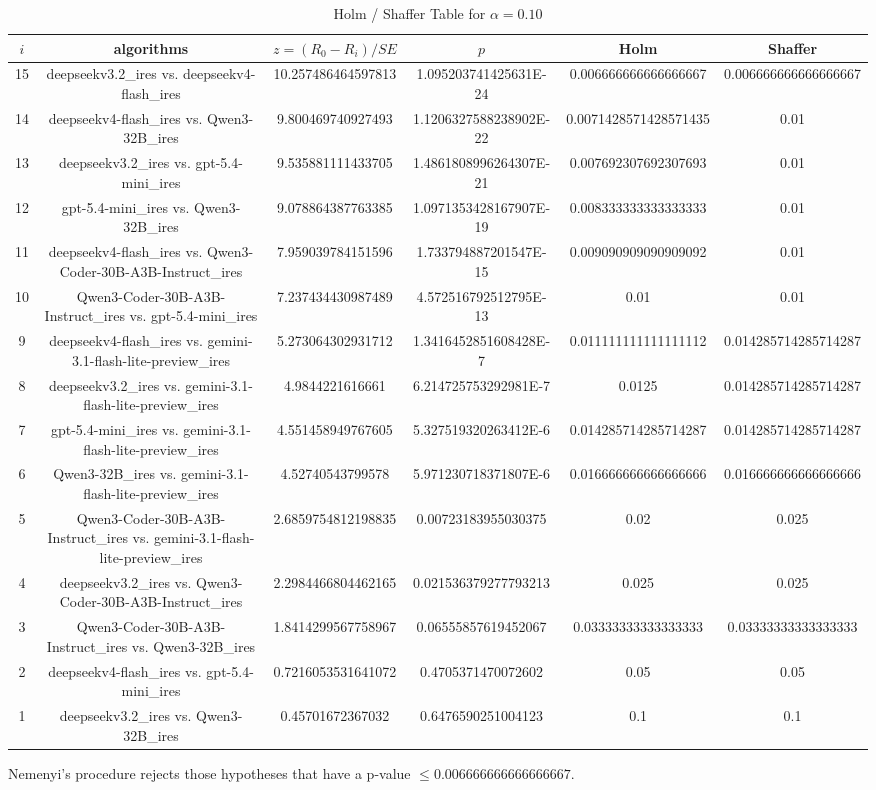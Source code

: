 \documentclass[a4paper,10pt]{article}
\begin{document}
\begin{landscape}
\begin{table}[!htp]
\centering\tiny
\caption{Holm / Shaffer Table for $\alpha=0.10$}
\begin{tabular}{cccccc}
$i$&algorithms&$z=(R_0 - R_i)/SE$&$p$&Holm&Shaffer\\
\hline
15&deepseekv3.2_ires vs. deepseekv4-flash_ires&10.257486464597813&1.095203741425631E-24&0.006666666666666667&0.006666666666666667\\14&deepseekv4-flash_ires vs. Qwen3-32B_ires&9.800469740927493&1.1206327588238902E-22&0.0071428571428571435&0.01\\13&deepseekv3.2_ires vs. gpt-5.4-mini_ires&9.535881111433705&1.4861808996264307E-21&0.007692307692307693&0.01\\12&gpt-5.4-mini_ires vs. Qwen3-32B_ires&9.078864387763385&1.0971353428167907E-19&0.008333333333333333&0.01\\11&deepseekv4-flash_ires vs. Qwen3-Coder-30B-A3B-Instruct_ires&7.959039784151596&1.733794887201547E-15&0.009090909090909092&0.01\\10&Qwen3-Coder-30B-A3B-Instruct_ires vs. gpt-5.4-mini_ires&7.237434430987489&4.572516792512795E-13&0.01&0.01\\9&deepseekv4-flash_ires vs. gemini-3.1-flash-lite-preview_ires&5.273064302931712&1.3416452851608428E-7&0.011111111111111112&0.014285714285714287\\8&deepseekv3.2_ires vs. gemini-3.1-flash-lite-preview_ires&4.9844221616661&6.214725753292981E-7&0.0125&0.014285714285714287\\7&gpt-5.4-mini_ires vs. gemini-3.1-flash-lite-preview_ires&4.551458949767605&5.327519320263412E-6&0.014285714285714287&0.014285714285714287\\6&Qwen3-32B_ires vs. gemini-3.1-flash-lite-preview_ires&4.52740543799578&5.971230718371807E-6&0.016666666666666666&0.016666666666666666\\5&Qwen3-Coder-30B-A3B-Instruct_ires vs. gemini-3.1-flash-lite-preview_ires&2.6859754812198835&0.00723183955030375&0.02&0.025\\4&deepseekv3.2_ires vs. Qwen3-Coder-30B-A3B-Instruct_ires&2.2984466804462165&0.021536379277793213&0.025&0.025\\3&Qwen3-Coder-30B-A3B-Instruct_ires vs. Qwen3-32B_ires&1.8414299567758967&0.06555857619452067&0.03333333333333333&0.03333333333333333\\2&deepseekv4-flash_ires vs. gpt-5.4-mini_ires&0.7216053531641072&0.4705371470072602&0.05&0.05\\1&deepseekv3.2_ires vs. Qwen3-32B_ires&0.45701672367032&0.6476590251004123&0.1&0.1\\\hline
\end{tabular}
\end{table}
Nemenyi's procedure rejects those hypotheses that have a p-value $\le0.006666666666666667$.



\end{landscape}
\end{document}
